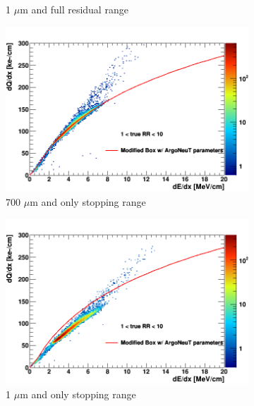 \begin{figure}[hp!]
\begin{subfigure}[b]{0.495\textwidth}
            \caption{1 $\mu$m and full residual range}%
            \label{fig:mu_2d_1}
        \end{subfigure}
        \begin{subfigure}[b]{0.495\textwidth}   
            \centering 
            \includegraphics[width=\textwidth]{mu_700um_lowRR}
            \caption{700 $\mu$m and only stopping range}%
            \label{fig:mu_2d_700_lowRR}
        \end{subfigure}
        \hfill
        \begin{subfigure}[b]{0.495\textwidth}   
            \centering 
            \includegraphics[width=\textwidth]{mu_1um_lowRR}
            \caption{1 $\mu$m and only stopping range}%
            \label{fig:mu_2d_1_lowRR}
        \end{subfigure}
	\caption[Charge to Energy Loss Conversion of a 1 GeV Muon]{
}
\end{figure}
